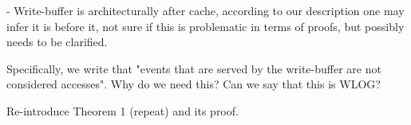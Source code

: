 
- Write-buffer is architecturally after cache, according to our description
one may infer it is before it, not sure if this is problematic in terms
of proofs, but possibly needs to be clarified.

Specifically, we write that "events that are served by the write-buffer are not
considered accesses". Why do we need this? Can we say that this is WLOG?

Re-introduce Theorem 1 (repeat) and its proof.
